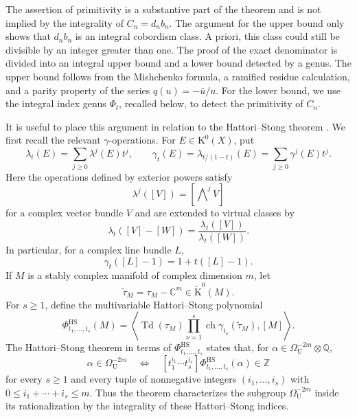 \documentclass[14pt,dvipsnames]{extarticle}
\numberwithin{equation}{subsection}
\theoremstyle{plain}
\theoremstyle{definition}
\theoremstyle{definition}
\DeclareMathOperator{\Td}{Td}
\newcommand{\Uu}{\mathrm{U}}
\newcommand{\Q}{\mathbb{Q}}
\begin{document}
The assertion of primitivity is a substantive part of the theorem and is not
implied by the integrality of $C_n=d_nb_n$.
The argument for the upper bound only shows that $d_nb_n$ is an integral cobordism
class. A priori, this class could still be divisible by an integer greater
than one. The
proof of the exact denominator is divided into an integral upper bound and a
lower bound detected by a genus. The upper bound
follows from the Mishchenko formula, a ramified residue calculation, and a
parity property of the series $q(u)=-\bar u/u$. For the lower bound, we use
the integral index genus $\Phi_t$, recalled below, to detect the primitivity
of $C_n$.

It is useful to place this argument in relation to the Hattori--Stong theorem
\cite{Hat66,Sto65}. We first recall the relevant $\gamma$-operations. For
$E\in\mathrm{K}^0(X)$, put
\[
 \lambda_t(E)=\sum_{j\geq0}\lambda^j(E)t^j,
 \qquad
 \gamma_t(E)
 =\lambda_{t/(1-t)}(E)
 =\sum_{j\geq0}\gamma^j(E)t^j.
\]
Here the operations defined by exterior powers satisfy
\[
 \lambda^j([V])=\left[\bigwedge\nolimits^j V\right]
\]
for a complex vector bundle $V$ and are extended to virtual classes by
\[
 \lambda_t([V]-[W])
 =\frac{\lambda_t([V])}{\lambda_t([W])}.
\]
In particular, for a complex line bundle $L$,
\[
 \gamma_t([L]-1)=1+t([L]-1).
\]
If $M$ is a stably complex manifold of complex dimension $m$, let
\[
 \widetilde\tau_M=\tau_M-\mathbb C^m\in\widetilde{\mathrm{K}}^0(M).
\]
For $s\geq1$, define the multivariable Hattori--Stong polynomial
\[
 \Phi^{\mathrm{HS}}_{t_1,\ldots,t_s}(M)
 =\left\langle
   \Td(\tau_M)
   \prod_{\nu=1}^{s}
    \operatorname{ch}\gamma_{t_\nu}(\widetilde\tau_M),
   [M]
  \right\rangle.
\]
The Hattori--Stong theorem in terms of
$\Phi^{\mathrm{HS}}_{t_1,\ldots,t_s}$ states that, for
$\alpha\in\Omega_{\Uu}^{-2m}\otimes\Q$,
\begin{equation}\label{eq:intro-hattori-stong-phi}
 \alpha\in\Omega_{\Uu}^{-2m}
 \quad\Longleftrightarrow\quad
 [t_1^{i_1}\cdots t_s^{i_s}]
 \Phi^{\mathrm{HS}}_{t_1,\ldots,t_s}(\alpha)\in\mathbb Z
\end{equation}
for every $s\geq1$ and every tuple of nonnegative integers
$(i_1,\ldots,i_s)$ with $0\leq i_1+\cdots+i_s\leq m$. Thus the theorem characterizes
the subgroup $\Omega_{\Uu}^{-2m}$ inside its rationalization by the
integrality of these Hattori--Stong indices.
\end{document}
